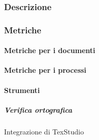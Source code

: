
		\subsubsection{Descrizione}

		\subsubsection{Metriche}

			\paragraph{Metriche per i documenti}
			
			\paragraph{Metriche per i processi}



			\paragraph{Strumenti}


			\subparagraph{Verifica ortografica}
			Integrazione di TexStudio


